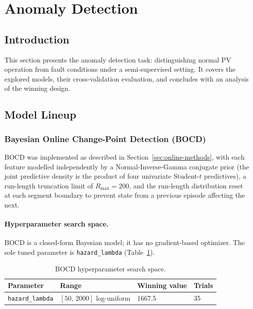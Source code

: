 \section{Anomaly Detection}\label{sec:anomaly-detection}

\subsection{Introduction}
This section presents the anomaly detection task: distinguishing normal PV operation from fault conditions under a semi-supervised setting. It covers the explored models, their cross-validation evaluation, and concludes with an analysis of the winning design.

\subsection{Model Lineup}

\subsubsection{Bayesian Online Change-Point Detection (BOCD)}

BOCD was implemented as described in Section~\ref{sec:online-methods}, with each feature modelled independently by a Normal-Inverse-Gamma conjugate prior (the joint predictive density is the product of four univariate Student-$t$ predictives), a run-length truncation limit of $R_{\max}=200$, and the run-length distribution reset at each segment boundary to prevent state from a previous episode affecting the next.

\paragraph{Hyperparameter search space.}
BOCD is a closed-form Bayesian model; it has no gradient-based optimizer. The sole tuned parameter is \texttt{hazard\_lambda} (Table~\ref{tab:bocd-hpo}).
\begin{table}[H]
\centering
\caption{BOCD hyperparameter search space.\label{tab:bocd-hpo}}
\begin{tabular}{llll}
\toprule
\textbf{Parameter} & \textbf{Range} & \textbf{Winning value} & \textbf{Trials} \\
\midrule
\texttt{hazard\_lambda} & $[50,\,2000]$ log-uniform & 1667.5 & 35 \\
\bottomrule
\end{tabular}
\end{table}

